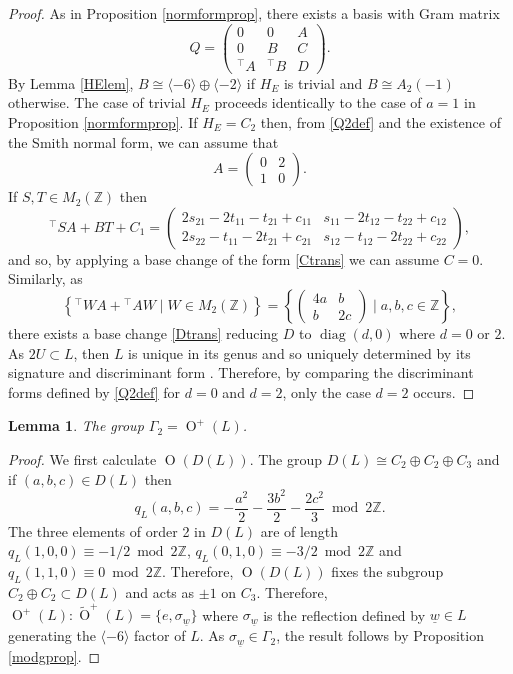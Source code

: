 \documentclass[11pt]{article}
\newtheorem{lem}[thm]{Lemma}
\newcommand{\ZZ}{\mathbb{Z}}
\newcommand{\la}{\langle}
\newcommand{\ra}{\rangle}
\newcommand{\opn}{\operatorname}
\newcommand{\op}{\oplus}
\newcommand{\beq}{\begin{equation*}}
\newcommand{\eeq}{\end{equation*}}
\newcommand{\bpm}{\begin{pmatrix}}
\newcommand{\epm}{\end{pmatrix}}
\begin{document}
\begin{proof}
  As in Proposition \ref{normformprop}, there exists a basis with Gram matrix
  \begin{equation}\label{Q2def}
    Q =
    \bpm
    0 & 0 & A \\
    0 & B & C \\
    {}^{\intercal}A & {}^{\intercal}B & D
  \epm.
  \end{equation}
  By Lemma \ref{HElem}, $B \cong \la -6 \ra \op \la -2 \ra$ if  $H_E$ is trivial and $B \cong A_2(-1)$ otherwise.
  The case of trivial $H_E$ proceeds identically to the case of $a=1$ in Proposition \ref{normformprop}.
  If $H_E = C_2$ then, from \eqref{Q2def} and the existence of the Smith normal form, we can assume that
  \beq
  A  = \bpm 0 & 2 \\ 1 & 0 \epm.
  \eeq
  If $S, T \in M_2(\ZZ)$ then
  \beq
      {}^{\intercal}S A + BT + C_1 =
      \bpm
      2 s_{21} - 2 t_{11} - t_{21} + c_{11} & s_{11} - 2t_{12} - t_{22} + c_{12} \\
      2s_{22} - t_{11} - 2t_{21} + c_{21}   & s_{12} - t_{12} - 2t_{22} + c_{22}
      \epm,
   \eeq
   and so, by applying a base change of the form \eqref{Ctrans}  we can assume $C=0$.
   Similarly, as
\beq
  \left \{{^{\intercal}}WA+{^{\intercal}}AW \mid W \in M_2(\ZZ) \right \}
  =
  \left \{
  \bpm
  4a & b \\
  b & 2c
  \epm
  \mid a,b,c \in \ZZ \right \},
  \eeq
  there exists a base change \eqref{Dtrans} reducing $D$ to $\opn{diag}(d, 0)$ where $d = 0$ or $2$.
   As $2U \subset L$, then $L$ is unique in its genus and so  uniquely determined by its signature and discriminant form \cite{Nikulin}.
   Therefore, by comparing the discriminant forms defined by \eqref{Q2def} for $d=0$ and $d=2$, only the case $d=2$ occurs.
\end{proof}
\begin{lem}\label{gamma2gplem}
  The group $\Gamma_2 = \opn{O}^+(L)$.
\end{lem}
\begin{proof}
  We first calculate $\opn{O}(D(L))$.
  The group $D(L) \cong C_2 \op C_2 \op C_3$ and if $(a,b,c) \in D(L)$ then
  \begin{equation}\label{qL2}
  q_{L}(a,b,c) = -\frac{a^2}{2} - \frac{3b^2}{2} - \frac{2c^2}{3} \bmod{ 2\ZZ}.
  \end{equation}
  The three elements of order 2 in $D(L)$ are of length
  $q_{L}(1,0,0) \equiv -1/2 \bmod{ 2\ZZ}$,
  $q_{L}(0,1,0) \equiv -3/2 \bmod{ 2\ZZ}$ and
  $q_{L}(1,1,0) \equiv 0 \bmod{ 2\ZZ}$.
  Therefore, $\opn{O}(D(L))$ fixes the subgroup $C_2 \op C_2 \subset D(L)$ and acts as $\pm 1$ on $C_3$.
  Therefore, $\opn{O}^+(L):\widetilde{\opn{O}}^+(L) = \{ e, \sigma_{\underline{w}} \}$ where $\sigma_{\underline{w}}$ is the reflection defined by $\underline{w} \in L$ generating the $\la -6 \ra$ factor of $L$.
  As $\sigma_{\underline{w}} \in \Gamma_2$, the result follows by Proposition \ref{modgprop}.
\end{proof}
\end{document}
